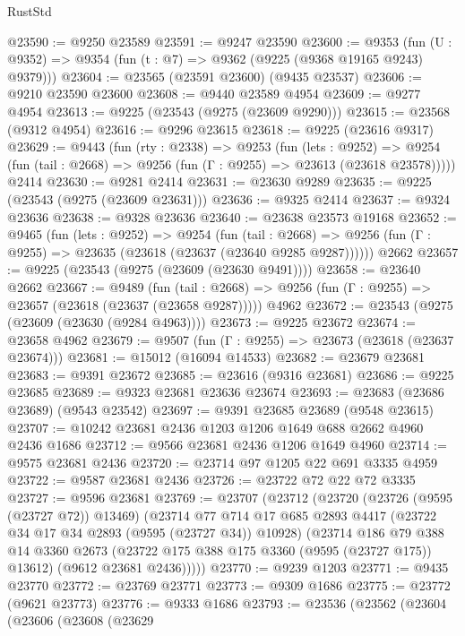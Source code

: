 \begin{lexlean}{RustStd}
\begin{coremodule}
@23590 := @9250 @23589
@23591 := @9247 @23590
@23600 := @9353
    (fun (U : @9352) => @9354 (fun (t : @7) => @9362 (@9225 (@9368 @19165 @9243) @9379)))
@23604 := @23565 (@23591 @23600) (@9435 @23537)
@23606 := @9210 @23590 @23600
@23608 := @9440 @23589 @4954
@23609 := @9277 @4954
@23613 := @9225 (@23543 (@9275 (@23609 @9290)))
@23615 := @23568 (@9312 @4954)
@23616 := @9296 @23615
@23618 := @9225 (@23616 @9317)
@23629 := @9443
    (fun (rty : @2338) =>
    @9253
      (fun (lets : @9252) =>
      @9254 (fun (tail : @2668) => @9256 (fun (Γ : @9255) => @23613 (@23618 @23578)))))
    @2414
@23630 := @9281 @2414
@23631 := @23630 @9289
@23635 := @9225 (@23543 (@9275 (@23609 @23631)))
@23636 := @9325 @2414
@23637 := @9324 @23636
@23638 := @9328 @23636
@23640 := @23638 @23573 @19168
@23652 := @9465
    (fun (lets : @9252) =>
    @9254
      (fun (tail : @2668) =>
      @9256 (fun (Γ : @9255) => @23635 (@23618 (@23637 (@23640 @9285 @9287))))))
    @2662
@23657 := @9225 (@23543 (@9275 (@23609 (@23630 @9491))))
@23658 := @23640 @2662
@23667 := @9489
    (fun (tail : @2668) => @9256 (fun (Γ : @9255) => @23657 (@23618 (@23637 (@23658 @9287)))))
    @4962
@23672 := @23543 (@9275 (@23609 (@23630 (@9284 @4963))))
@23673 := @9225 @23672
@23674 := @23658 @4962
@23679 := @9507 (fun (Γ : @9255) => @23673 (@23618 (@23637 @23674)))
@23681 := @15012 (@16094 @14533)
@23682 := @23679 @23681
@23683 := @9391 @23672
@23685 := @23616 (@9316 @23681)
@23686 := @9225 @23685
@23689 := @9323 @23681 @23636 @23674
@23693 := @23683 (@23686 @23689) (@9543 @23542)
@23697 := @9391 @23685 @23689 (@9548 @23615)
@23707 := @10242 @23681 @2436 @1203 @1206 @1649 @688 @2662 @4960 @2436 @1686
@23712 := @9566 @23681 @2436 @1206 @1649 @4960
@23714 := @9575 @23681 @2436
@23720 := @23714 @97 @1205 @22 @691 @3335 @4959
@23722 := @9587 @23681 @2436
@23726 := @23722 @72 @22 @72 @3335
@23727 := @9596 @23681
@23769 := @23707
    (@23712
      (@23720
        (@23726 (@9595 (@23727 @72)) @13469)
        (@23714
          @77
          @714
          @17
          @685
          @2893
          @4417
          (@23722 @34 @17 @34 @2893 (@9595 (@23727 @34)) @10928)
          (@23714
            @186
            @79
            @388
            @14
            @3360
            @2673
            (@23722 @175 @388 @175 @3360 (@9595 (@23727 @175)) @13612)
            (@9612 @23681 @2436)))))
@23770 := @9239 @1203
@23771 := @9435 @23770
@23772 := @23769 @23771
@23773 := @9309 @1686
@23775 := @23772 (@9621 @23773)
@23776 := @9333 @1686
@23793 := @23536
    (@23562
      (@23604
        (@23606
          (@23608
            (@23629

\end{coremodule}
\end{lexlean}

